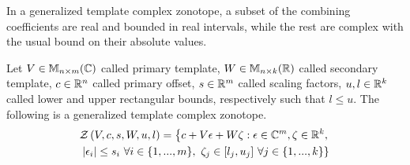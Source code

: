 In a generalized template complex zonotope,
a subset of the combining coefficients are real and bounded in real
intervals, while the rest are complex with the usual bound on their
absolute values.

\begin{definition}
Let $V\in\mathbb{M}_{n\times m}(\mathbb{C})$ called primary template, $W\in\mathbb{M}_{n\times k}(\mathbb{R})$
called secondary template, $c\in\mathbb{R}^n$ called primary offset,
$s\in\mathbb{R}^m$ called scaling factors, $u,l\in\mathbb{R}^k$ called lower
and upper rectangular bounds, respectively such that $l\leq u$.  The
following is a generalized template complex
zonotope.
\begin{multline}
\mathcal{Z}\left(V,c,s,W,u,l\right) =
\left\{
  c+V\epsilon+W\zeta:\epsilon\in\mathbb{C}^m,\zeta\in\mathbb{R}^k,\right.\\ \left.  \left|\epsilon_i\right|\leq
 s_i~\forall i\in\{1,...,m\},~\zeta_j\in[l_j,u_j]~\forall j\in \{1,...,k\}
\right\}
\end{multline}
\end{definition}